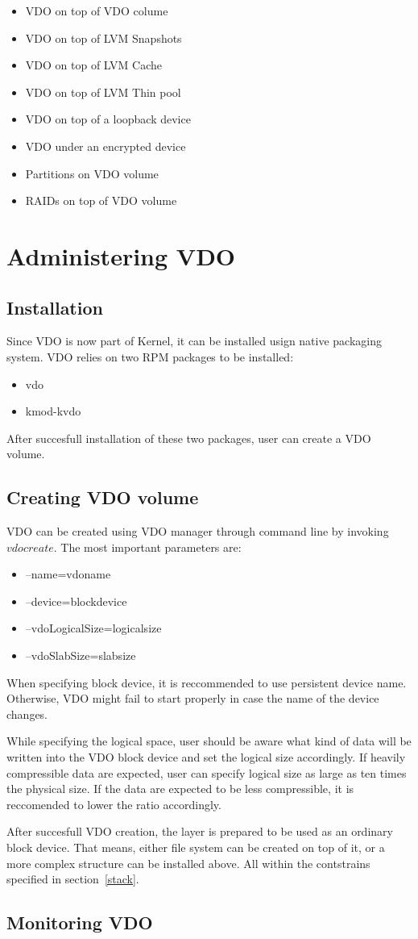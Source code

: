 \documentclass[
  color, %
  table, %
  lof,   %
  lot,   %
]{fithesis3}
\begin{document}
\begin{itemize}
  \item VDO on top of VDO colume
  \item VDO on top of LVM Snapshots
  \item VDO on top of LVM Cache
  \item VDO on top of LVM Thin pool
  \item VDO on top of a loopback device
  \item VDO under an encrypted device
  \item Partitions on VDO volume
  \item RAIDs on top of VDO volume          
\end{itemize}

\section{Administering VDO}
\subsection{Installation}
Since VDO is now part of Kernel, it can be installed usign native packaging system. VDO relies on two RPM packages to be installed:
\begin{itemize}
    \item vdo
    \item kmod-kvdo
\end{itemize}
After succesfull installation of these two packages, user can create a VDO volume.

\subsection{Creating VDO volume}
VDO can be created using VDO manager through command line by invoking $vdo create$.
The most important parameters are:
\begin{itemize}
    \item --name=vdoname
    \item --device=blockdevice
    \item --vdoLogicalSize=logicalsize
    \item --vdoSlabSize=slabsize
\end{itemize}

When specifying block device, it is reccommended to use persistent device name. Otherwise, VDO might fail to start properly in case the name of the device changes.

While specifying the logical space, user should be aware what kind of data will be written into the VDO block device and set the logical size accordingly. If heavily compressible data are expected, user can specify logical size as large as ten times the physical size. If the data are expected to be less compressible, it is reccomended to lower the ratio accordingly.

After succesfull VDO creation, the layer is prepared to be used as an ordinary block device. That means, either file system can be created on top of it, or a more complex structure can be installed above. All within the contstrains specified in section~\ref{stack}.

\subsection{Monitoring VDO}
\end{document}
